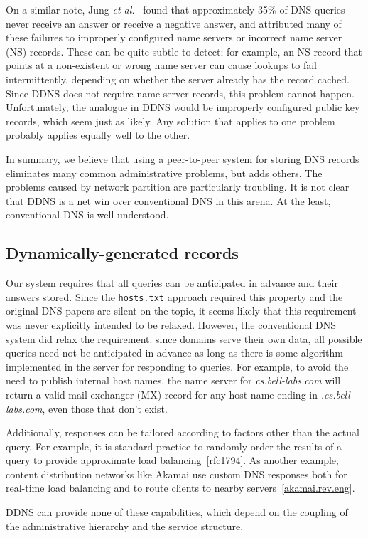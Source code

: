 On a similar note, Jung {\it et al.}~\cite{dnscache:sigcommimw01}
found that approximately 35\% of DNS queries never receive
an answer or receive a negative answer, and attributed
many of these failures to 
improperly configured name servers or incorrect name server (NS) records.
These can be quite subtle to detect; for example, an NS record that points
at a non-existent or wrong name server can cause lookups to fail
intermittently, depending on whether the server already has the 
record cached.
Since DDNS does not require name server records, this problem cannot happen.
Unfortunately, the analogue in DDNS would be improperly
configured public key records, which seem just as likely.
Any solution that applies to one problem
probably applies equally well to the other.

In summary, we believe that using a peer-to-peer system for
storing DNS records eliminates many common administrative
problems, but adds others.
The problems caused by network partition are particularly troubling.
It is not clear that DDNS is a net win over conventional DNS in
this arena.  At the least, conventional DNS is well understood.

\subsection{Dynamically-generated records}

Our system requires that all queries
can be anticipated in advance and their answers stored.
Since the {\tt hosts.txt} approach required this property
and the original DNS papers are silent on the topic,
it seems likely that this requirement was never 
explicitly intended to be relaxed.
However, the conventional DNS system did relax the requirement:
since domains serve their own data, all possible queries need 
not be anticipated in advance as long as there is some algorithm
implemented in the server for responding to queries.
For example, to avoid the need to publish internal host names,
the name server for
{\em cs.bell-labs.com} will return a valid mail exchanger (MX) record
for any host name ending in {\em .cs.bell-labs.com}, even
those that don't exist.

Additionally, responses can be tailored according to factors
other than the actual query.
For example, it is standard practice to randomly order the results
of a query to provide approximate load balancing~\ref{rfc1794}.
As another example, content distribution networks like Akamai
use custom DNS responses both for real-time load balancing and
to route clients to nearby servers~\ref{akamai.rev.eng}.

DDNS can provide none of these capabilities, which depend
on the coupling of the administrative hierarchy and the service structure.


